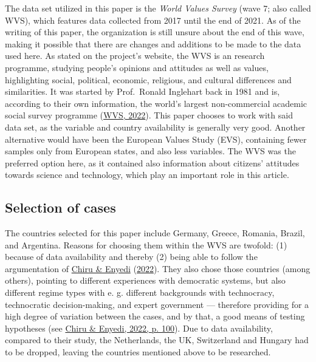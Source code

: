 \documentclass[
  12pt,
  english,
]{article}
\begin{document}
The data set utilized in this paper is the \emph{World Values Survey}
(wave 7; also called WVS), which features data collected from 2017 until
the end of 2021. As of the writing of this paper, the organization is
still unsure about the end of this wave, making it possible that there
are changes and additions to be made to the data used here. As stated on
the project's website, the WVS is an research programme, studying
people's opinions and attitudes as well as values, highlighting social,
political, economic, religious, and cultural differences and
similarities. It was started by Prof.~Ronald Inglehart back in 1981 and
is, according to their own information, the world's largest
non-commercial academic social survey programme
(\protect\hyperlink{ref-wvs2022info}{WVS, 2022}). This paper chooses to
work with said data set, as the variable and country availability is
generally very good. Another alternative would have been the European
Values Study (EVS), containing fewer samples only from European states,
and also less variables. The WVS was the preferred option here, as it
contained also information about citizens' attitudes towards science and
technology, which play an important role in this article.

\hypertarget{selection-of-cases}{%
\subsection{Selection of cases}\label{selection-of-cases}}

The countries selected for this paper include Germany, Greece, Romania,
Brazil, and Argentina. Reasons for choosing them within the WVS are
twofold: (1) because of data availability and thereby (2) being able to
follow the argumentation of \protect\hyperlink{ref-chiru2022wants}{Chiru
\& Enyedi} (\protect\hyperlink{ref-chiru2022wants}{2022}). They also
chose those countries (among others), pointing to different experiences
with democratic systems, but also different regime types with e. g.
different backgrounds with technocracy, technocratic decision-making,
and expert government --- therefore providing for a high degree of
variation between the cases, and by that, a good means of testing
hypotheses (see \protect\hyperlink{ref-chiru2022wants}{Chiru \& Enyedi,
2022, p. 100}). Due to data availability, compared to their study, the
Netherlands, the UK, Switzerland and Hungary had to be dropped, leaving
the countries mentioned above to be researched.
\end{document}
